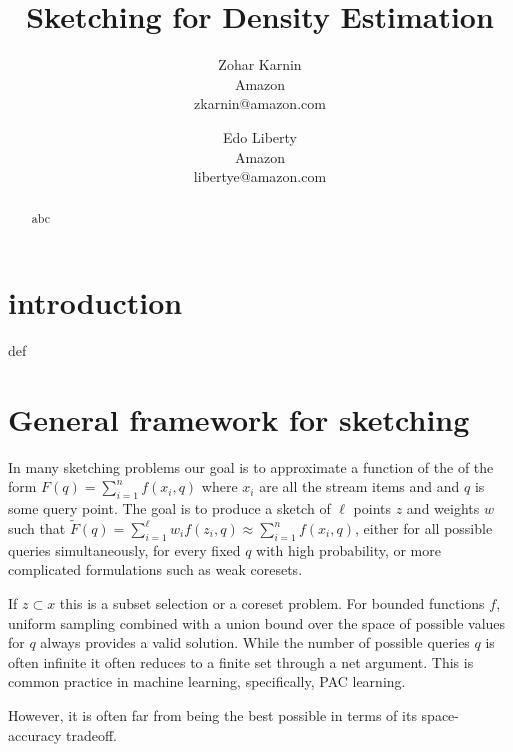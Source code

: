 \documentclass{article} %
\title{Sketching for Density Estimation}
\date{\nonumber}
\author{
Zohar Karnin\\Amazon\\zkarnin@amazon.com
\and
Edo Liberty\\Amazon\\libertye@amazon.com
}
\begin{document}
\maketitle

\begin{abstract}
abc
\end{abstract}

\section{introduction}
def

\section{General framework for sketching}
In many sketching problems our goal is to approximate a function of the of the form $F(q) = \sum_{i=1}^{n} f(x_i, q)$ where $x_i$ are all the stream items and and $q$ is some query point. 
The goal is to produce a sketch of $\ell$ points $z$ and weights $w$ such that $\tilde F(q) = \sum_{i=1}^{\ell}w_i f(z_i,q) \approx \sum_{i=1}^{n} f(x_i, q)$, either for all possible queries simultaneously, for every fixed $q$ with high probability, or more complicated formulations such as weak coresets.
 
If $z \subset x$ this is a subset selection or a coreset problem. 
For bounded functions $f$, uniform sampling combined with a union bound over the space of possible values for $q$ always provides a valid solution. 
While the number of possible queries $q$ is often infinite it often reduces to a finite set through a net argument. 
This is common practice in machine learning, specifically, PAC learning. 

However, it is often far from being the best possible in terms of its space-accuracy tradeoff. 
\end{document}
